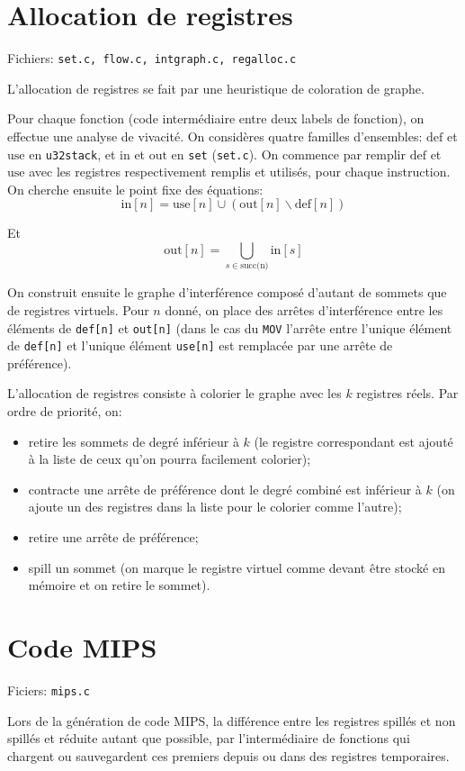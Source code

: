 \documentclass{article}
\begin{document}
	\section{Allocation de registres}
		\par Fichiers: \verb#set.c, flow.c, intgraph.c, regalloc.c#
		\par L'allocation de registres se fait par une heuristique de coloration de graphe.
		\par Pour chaque fonction (code intermédiaire entre deux labels de fonction), on effectue une analyse de vivacité. On considères quatre familles d'ensembles: $\text{def}$ et $\text{use}$ en \verb#u32stack#, et $\text{in}$ et $\text{out}$ en \verb#set# (\verb#set.c#). On commence par remplir $\text{def}$ et $\text{use}$ avec les registres respectivement remplis et utilisés, pour chaque instruction. On cherche ensuite le point fixe des équations:
		\[
			\text{in}[n] = \text{use}[n] \cup (\text{out}[n] \backslash \text{def}[n])
		\]
		\par Et
		\[
			\text{out}[n] = \bigcup_{s \in \text{succ(n)}} \text{in}[s]
		\]
		\par On construit ensuite le graphe d'interférence composé d'autant de sommets que de registres virtuels. Pour $n$ donné, on place des arrêtes d'interférence entre les éléments de \verb#def[n]# et \verb#out[n]# (dans le cas du \verb#MOV# l'arrête entre l'unique élément de \verb#def[n]# et l'unique élément \verb#use[n]# est remplacée par une arrête de préférence).
		\par L'allocation de registres consiste à colorier le graphe avec les $k$ registres réels. Par ordre de priorité, on:
		\begin{itemize}
			\item retire les sommets de degré inférieur à $k$ (le registre correspondant est ajouté à la liste de ceux qu'on pourra facilement colorier);
			\item contracte une arrête de préférence dont le degré combiné est inférieur à $k$ (on ajoute un des registres dans la liste pour le colorier comme l'autre);
			\item retire une arrête de préférence;
			\item spill un sommet (on marque le registre virtuel comme devant être stocké en mémoire et on retire le sommet).
		\end{itemize}
	\section{Code MIPS}
		\par Ficiers: \verb#mips.c#
		\par Lors de la génération de code MIPS, la différence entre les registres spillés et non spillés et réduite autant que possible, par l'intermédiaire de fonctions qui chargent ou sauvegardent ces premiers depuis ou dans des registres temporaires.
\end{document}
